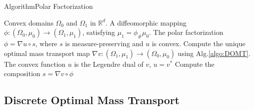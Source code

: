 \documentclass{beamer}
\theoremstyle{definition}
\begin{document}
\begin{frame}{Algorithm}{Polar Factorization}
\begin{algorithm}[H]
\caption{Polar Factorization of Mapping}
\begin{algorithmic}
\REQUIRE Convex domains $\Omega_0$ and $\Omega_1$ in $\mathbb{R}^d$. A diffeomorphic mapping $\phi:(\Omega_0,\mu_0)\rightarrow (\Omega_1, \mu_1)$, satisfying $\mu_1=\phi_\#\mu_0$.
\ENSURE The polar factorization $\phi = \nabla u\circ s$, where $s$ is measure-preserving and $u$ is convex.
\STATE Compute the unique optimal mass transport map $\nabla v:(\Omega_1, \mu_1)\rightarrow (\Omega_0,\mu_0)$ using Alg.\ref{algo:DOMT}. The convex function $u$ is the Legendre dual of $v$, $u=v^*$
\STATE Compute the composition $s=\nabla v\circ\phi$
\end{algorithmic}
\label{Algo:PolarFac}
\end{algorithm}
\end{frame}


\subsection{Discrete Optimal Mass Transport}
%
\end{document}

